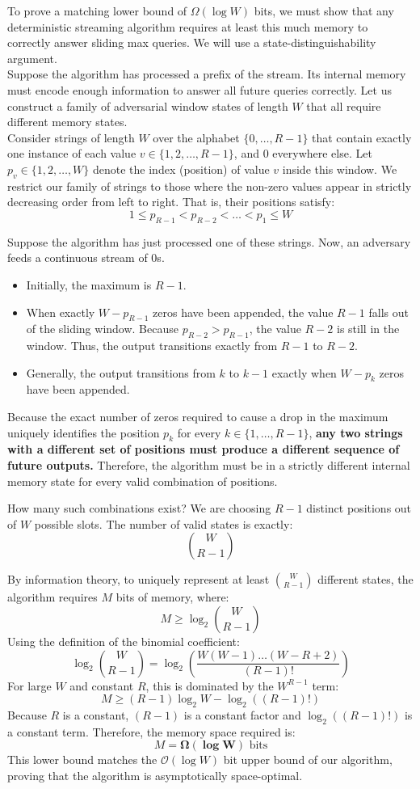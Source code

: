 \documentclass[11pt]{article}
\begin{document}
To prove a matching lower bound of $\Omega(\log W)$ bits, we must show that any deterministic streaming algorithm requires at least this much memory to correctly answer sliding max queries. We will use a state-distinguishability argument.\\
Suppose the algorithm has processed a prefix of the stream. Its internal memory must encode enough information to answer all future queries correctly. Let us construct a family of adversarial window states of length $W$ that all require different memory states.\\
Consider strings of length $W$ over the alphabet $\{0, \dots, R-1\}$ that contain exactly one instance of each value $v \in \{1, 2, \dots, R-1\}$, and $0$ everywhere else. Let $p_v \in \{1, 2, \dots, W\}$ denote the index (position) of value $v$ inside this window. We restrict our family of strings to those where the non-zero values appear in strictly decreasing order from left to right. That is, their positions satisfy:
\[
1 \le p_{R-1} < p_{R-2} < \dots < p_1 \le W
\]

Suppose the algorithm has just processed one of these strings. Now, an adversary feeds a continuous stream of $0$s. 
\begin{itemize}
    \item Initially, the maximum is $R-1$.
    \item When exactly $W - p_{R-1}$ zeros have been appended, the value $R-1$ falls out of the sliding window. Because $p_{R-2} > p_{R-1}$, the value $R-2$ is still in the window. Thus, the output transitions exactly from $R-1$ to $R-2$.
    \item Generally, the output transitions from $k$ to $k-1$ exactly when $W - p_k$ zeros have been appended.
\end{itemize}

Because the exact number of zeros required to cause a drop in the maximum uniquely identifies the position $p_k$ for every $k \in \{1, \dots, R-1\}$, \textbf{any two strings with a different set of positions must produce a different sequence of future outputs.} Therefore, the algorithm must be in a strictly different internal memory state for every valid combination of positions.

How many such combinations exist? We are choosing $R-1$ distinct positions out of $W$ possible slots. The number of valid states is exactly:
\[
\binom{W}{R-1}
\]

By information theory, to uniquely represent at least $\binom{W}{R-1}$ different states, the algorithm requires $M$ bits of memory, where:
\[
M \ge \log_2 \binom{W}{R-1}
\]
Using the definition of the binomial coefficient:
\[
\log_2 \binom{W}{R-1} = \log_2 \left( \frac{W(W-1)\dots(W-R+2)}{(R-1)!} \right)
\]
For large $W$ and constant $R$, this is dominated by the $W^{R-1}$ term:
\[
M \ge (R-1) \log_2 W - \log_2((R-1)!)
\]
Because $R$ is a constant, $(R-1)$ is a constant factor and $\log_2((R-1)!)$ is a constant term. Therefore, the memory space required is:
\[
M = \mathbf{\Omega(\log W)} \text{ bits}
\]
This lower bound matches the $\mathcal{O}(\log W)$ bit upper bound of our algorithm, proving that the algorithm is asymptotically space-optimal.
\end{document}
